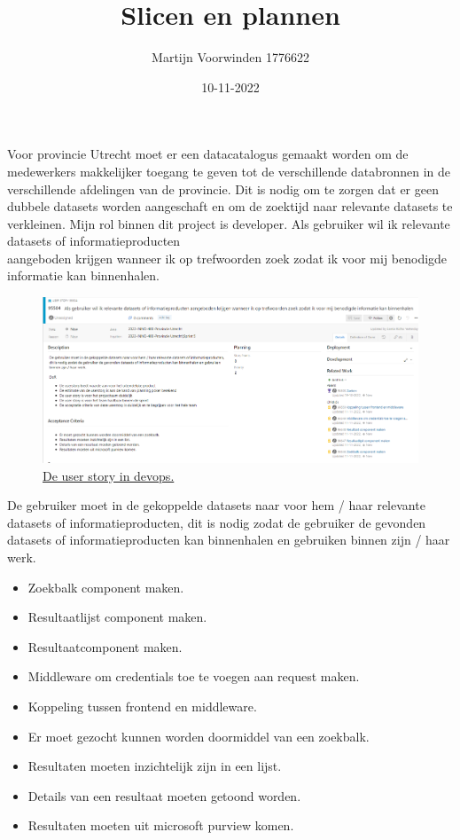 \documentclass{article}
\title{Slicen en plannen}
\author{Martijn Voorwinden 1776622}
\date{10-11-2022}
\newcommand{\us}[8]{
    \maketitle
    \subsection*{Inleiding}
    #1
    \subsection*{Criteria}
    \begin{itemize}
        \item Kwalitatief product maken.
        \item Planning - een planning opstellen.
        \item Verantwoorden van (noodzakelijke aanpassingen in) planning.
    \end{itemize}
    \subsection*{User Story}
    \textbf{#2}
    #3
    \subsubsection*{Taken}
    #4
    \subsubsection*{Acceptatiecriteria}
    #5
    \subsubsection*{Definition of Done (DoD)}
    #6
    \subsubsection*{Estimate}
    #7
    \subsubsection*{Realisatie}
    #8
    \\ \newline \href{https://github.com/MartijnCBV/INNO/tree/master}{Product tot nu toe.}
}
\begin{document}
    \us
    {
        Voor provincie Utrecht moet er een datacatalogus gemaakt worden om de medewerkers makkelijker toegang te geven tot de verschillende databronnen in de verschillende afdelingen van de provincie.
        Dit is nodig om te zorgen dat er geen dubbele datasets worden aangeschaft en om de zoektijd naar relevante datasets te verkleinen.
        Mijn rol binnen dit project is developer.
    }
    {
        Als gebruiker wil ik relevante datasets of informatieproducten \\ aangeboden krijgen wanneer ik op trefwoorden zoek zodat ik voor mij benodigde informatie kan binnenhalen.
    }
    {
        \begin{figure}[H]
            \includegraphics[width=\textwidth,height=\textheight,keepaspectratio]{us_01.png}
            \caption{\href{https://dev.azure.com/HU-HBO-ICT/2022-INNO-400-Provincie\%20Utrecht/_backlogs/backlog/2022-INNO-400-Provincie\%20Utrecht\%20Team/Epics/?workitem=9550}{De user story in devops.}}
            \label{fig:us_01}
        \end{figure}
        \noindent De gebruiker moet in de gekoppelde datasets naar voor hem / haar relevante datasets of informatieproducten,
        dit is nodig zodat de gebruiker de gevonden datasets of informatieproducten kan binnenhalen en gebruiken binnen zijn / haar werk.
    }
    {
        \begin{itemize}
            \item Zoekbalk component maken.
            \item Resultaatlijst component maken.
            \item Resultaatcomponent maken.
            \item Middleware om credentials toe te voegen aan request maken.
            \item Koppeling tussen frontend en middleware.
        \end{itemize}
    }
    {
        \begin{itemize}
            \item Er moet gezocht kunnen worden doormiddel van een zoekbalk.
            \item Resultaten moeten inzichtelijk zijn in een lijst.
            \item Details van een resultaat moeten getoond worden.
            \item Resultaten moeten uit microsoft purview komen.
        \end{itemize}
    }
\end{document}
